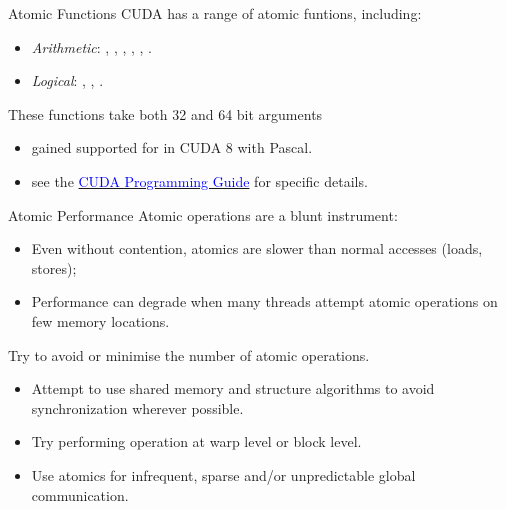 \documentclass[aspectratio=43]{beamer}
\begin{document}
\begin{frame}[fragile]{Atomic Functions}
    CUDA has a range of atomic funtions, including:
    \begin{itemize}
        \item \emph{Arithmetic}:
            , , , , , .
        \item \emph{Logical}: 
            , , .
    \end{itemize}
    These functions take both 32 and 64 bit arguments
    \begin{itemize}
        \item {} gained supported for  in CUDA 8 with Pascal.
        \item see the \href{https://docs.nvidia.com/cuda/cuda-c-programming-guide/index.html#atomic-functions}{\textcolor{blue}{CUDA Programming Guide}} for specific details.
    \end{itemize}
\end{frame}

\begin{frame}[fragile]{Atomic Performance}
    Atomic operations are a blunt instrument:
    \begin{itemize}
        \item Even without contention, atomics are slower than normal accesses (loads, stores);
        \item Performance can degrade when many threads attempt atomic operations on few memory locations.
    \end{itemize}
    Try to avoid or minimise the number of atomic operations.
    \begin{itemize}
        \item Attempt to use shared memory and structure algorithms to avoid synchronization wherever possible.
        \item Try performing operation at warp level or block level.
        \item Use atomics for infrequent, sparse and/or unpredictable global communication.
    \end{itemize}
\end{frame}
\end{document}
